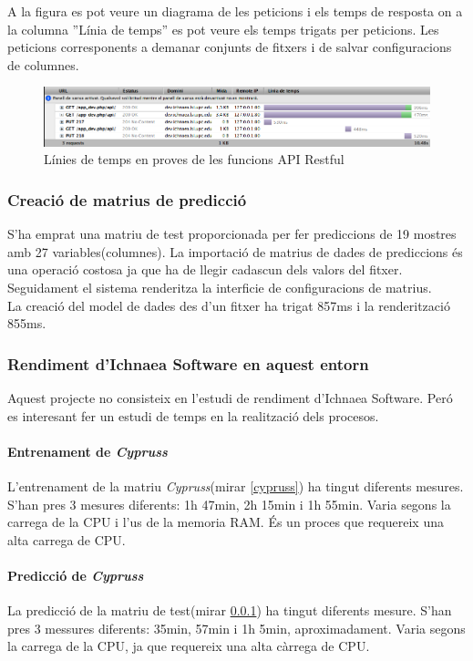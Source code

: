 A la figura  es pot veure un diagrama de les peticions i els temps de resposta on a la columna ''Línia de temps'' es pot veure els temps trigats per peticions. Les peticions corresponents a demanar conjunts de fitxers i de salvar configuracions de columnes.
\begin{figure}[h]
  \includegraphics[scale=0.4]{img/test/firebugAPI.png}
  \caption{Línies de temps en proves de les funcions API Restful}
  \label{fig:firebugAPI}
\end{figure}


\subsubsection{Creaci\'{o} de matrius de predicci\'{o}}
\label{cypruss_test}
S'ha emprat una matriu de test proporcionada per fer prediccions de 19 mostres amb 27 variables(columnes). La importaci\'{o} de matrius de dades de prediccions \'{e}s una operaci\'{o} costosa ja que ha de llegir cadascun dels valors del fitxer. Seguidament el sistema renderitza la interficie de configuracions de matrius.\\

La creaci\'{o} del model de dades des d'un fitxer ha trigat 857ms i la renderitzaci\'{o} 855ms.

\subsubsection{Rendiment d'Ichnaea Software en aquest entorn}
Aquest projecte no consisteix en l'estudi de rendiment d'Ichnaea Software. Per\'{o} es interesant fer un estudi de temps en la realitzaci\'{o} dels procesos.

\paragraph{Entrenament de \textit{Cypruss}}
L'entrenament de la matriu \textit{Cypruss}(mirar \ref{cypruss}) ha tingut diferents mesures. S'han pres 3 mesures diferents: 1h 47min, 2h 15min i 1h 55min. Varia segons la carrega de la CPU i l'us de la memoria RAM. \'{E}s un proces que requereix una alta carrega de CPU.

\paragraph{Predicci\'{o} de \textit{Cypruss}}
La predicci\'{o} de la matriu de test(mirar \ref{cypruss_test}) ha tingut diferents mesure. S'han pres 3 messures diferents: 35min, 57min i 1h 5min, aproximadament. Varia segons la carrega de la CPU, ja que requereix una alta c\`{a}rrega de CPU.

